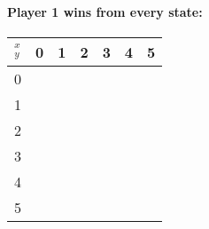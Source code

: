 \documentclass[12pt]{article}
\begin{document}
\paragraph*{Player 1 wins from every state:}


\begin{tabular}{c | c | c | c | c | c | c}
$_y ^x$ & 0 & 1 & 2 & 3 & 4 & 5 \\ \hline
0 & & & & & & \\ \hline
1 & & & & & & \\ \hline
2 & & & & & & \\ \hline
3 & & & & & & \\ \hline
4 & & & & & & \\ \hline
5 & & & & & & \\ 

\end{tabular}
\end{document}

